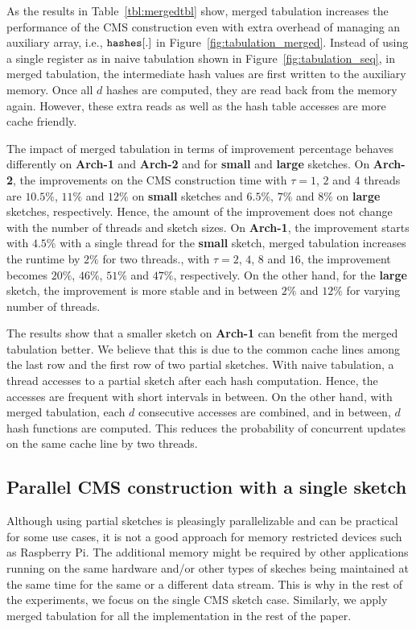 \documentclass[10pt, conference, compsocconf]{IEEEtran}
\begin{document}
\begin{table}[htbp]
\end{table}

As the results in Table~\ref{tbl:mergedtbl} show, merged tabulation increases the performance of the CMS construction even with extra overhead of managing an auxiliary array, i.e., $\tt hashes[.]$ in Figure~\ref{fig:tabulation_merged}. Instead of using a single register as in naive tabulation shown in Figure~\ref{fig:tabulation_seq}, in merged tabulation, the intermediate hash values are first written to the auxiliary memory. Once all $d$ hashes are computed, they are read back from the memory again. However, these extra reads as well as the hash table accesses are more cache friendly.

The impact of merged tabulation in terms of improvement percentage behaves differently on {\bf Arch-1} and {\bf Arch-2} and for {\bf small} and {\bf large} sketches. On {\bf Arch-2}, the improvements on the CMS construction time with $\tau = 1$, $2$ and $4$ threads are $10.5\%$, $11\%$ and $12\%$ on {\bf small} sketches and $6.5\%$, $7\%$ and $8\%$ on {\bf large} sketches, respectively.  Hence, the amount of the improvement does not change with the number of threads and sketch sizes. On {\bf Arch-1}, the improvement starts with $4.5\%$ with a single thread for the {\bf small} sketch, merged tabulation increases the runtime by $2\%$ for two threads., with $\tau = 2$, $4$, $8$ and $16$, the improvement becomes $20\%$, $46\%$, $51\%$ and $47\%$, respectively. On the other hand, for the {\bf large} sketch, the improvement is more stable and in between $2\%$ and $12\%$ for varying number of threads.

The results show that a smaller sketch on {\bf Arch-1} can benefit from the merged tabulation better. We believe that this is due to the common cache lines among the last row and the first row of two partial sketches. With naive tabulation, a thread accesses to a partial sketch after each hash computation. Hence, the accesses are frequent  with short intervals in between. On the other hand, with merged tabulation, each $d$ consecutive accesses are combined, and in between, $d$ hash functions are computed. This reduces the probability of concurrent updates on the same cache line by two threads.  

\subsection{Parallel CMS construction with a single sketch}

Although using partial sketches is pleasingly parallelizable and can be practical for some use cases, it is not a good approach for memory restricted devices such as Raspberry Pi. The additional memory might be required by other applications running on the same hardware and/or other types of skeches being maintained at the same time for the same or a different data stream. This is why in the rest of the experiments, we focus on the single CMS sketch case. Similarly, we apply merged tabulation for all the implementation in the rest of the paper.  
\end{document}
